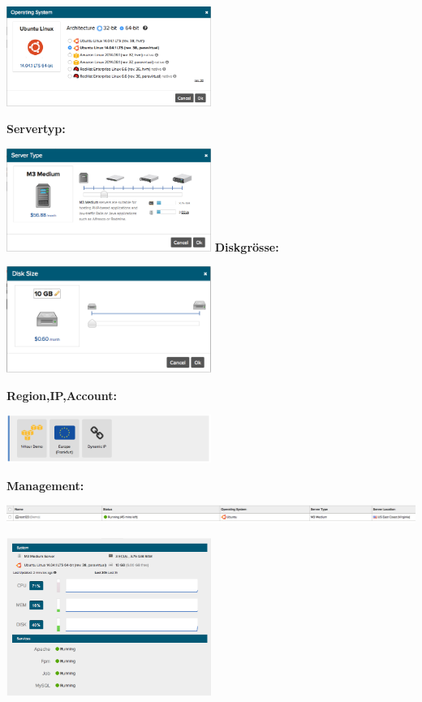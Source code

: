 \documentclass[11pt]{scrartcl}
\begin{document}
\includegraphics[width=0.5\textwidth]{aws_operating_system}

\textbf{Servertyp:}

\includegraphics[width=0.5\textwidth]{aws_servertype}
\newpage
\textbf{Diskgrösse:}

\includegraphics[width=0.5\textwidth]{aws_disk}

\textbf{Region,IP,Account:}

\includegraphics[width=0.5\textwidth]{aws_random}

\textbf{Management:}

\includegraphics[width=\textwidth]{aws_overview_managment}

\includegraphics[width=0.5\textwidth]{aws_resourcen}
\end{document}
